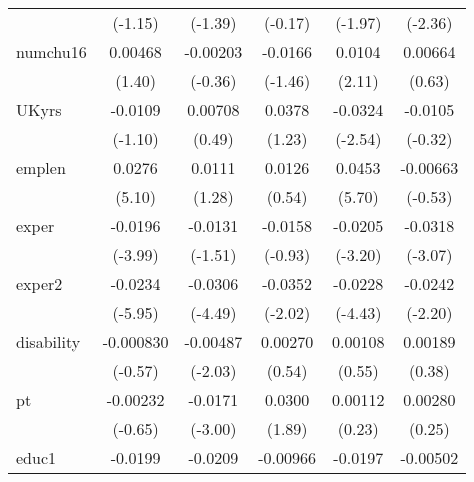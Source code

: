 \begin{table}[htbp]
\begin{tabular}{l*{5}{c}}
            &     (-1.15)         &     (-1.39)         &     (-0.17)         &     (-1.97)         &     (-2.36)         \\
numchu16    &     0.00468         &    -0.00203         &     -0.0166         &      0.0104\sym{*}  &     0.00664         \\
            &      (1.40)         &     (-0.36)         &     (-1.46)         &      (2.11)         &      (0.63)         \\
UKyrs       &     -0.0109         &     0.00708         &      0.0378         &     -0.0324\sym{*}  &     -0.0105         \\
            &     (-1.10)         &      (0.49)         &      (1.23)         &     (-2.54)         &     (-0.32)         \\
emplen      &      0.0276\sym{***}&      0.0111         &      0.0126         &      0.0453\sym{***}&    -0.00663         \\
            &      (5.10)         &      (1.28)         &      (0.54)         &      (5.70)         &     (-0.53)         \\
exper       &     -0.0196\sym{***}&     -0.0131         &     -0.0158         &     -0.0205\sym{**} &     -0.0318\sym{**} \\
            &     (-3.99)         &     (-1.51)         &     (-0.93)         &     (-3.20)         &     (-3.07)         \\
exper2      &     -0.0234\sym{***}&     -0.0306\sym{***}&     -0.0352\sym{*}  &     -0.0228\sym{***}&     -0.0242\sym{*}  \\
            &     (-5.95)         &     (-4.49)         &     (-2.02)         &     (-4.43)         &     (-2.20)         \\
disability  &   -0.000830         &    -0.00487\sym{*}  &     0.00270         &     0.00108         &     0.00189         \\
            &     (-0.57)         &     (-2.03)         &      (0.54)         &      (0.55)         &      (0.38)         \\
pt          &    -0.00232         &     -0.0171\sym{**} &      0.0300         &     0.00112         &     0.00280         \\
            &     (-0.65)         &     (-3.00)         &      (1.89)         &      (0.23)         &      (0.25)         \\
educ1       &     -0.0199\sym{***}&     -0.0209\sym{***}&    -0.00966         &     -0.0197\sym{***}&    -0.00502         \\

\end{tabular}
\end{table}
